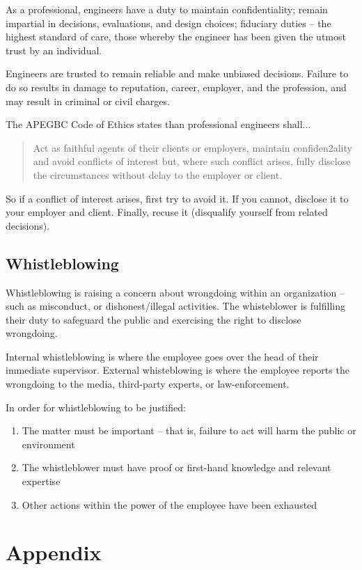 \documentclass{article}
\renewcommand\appendix{\par
  \setcounter{section}{0}
  \setcounter{subsection}{0}
  \setcounter{figure}{0}
  \setcounter{table}{0}
  \renewcommand\thesection{Appendix \Alph{section}}
  \renewcommand\thefigure{\Alph{section}\arabic{figure}}
  \renewcommand\thetable{\Alph{section}\arabic{table}}
}
\begin{document}
As a professional, engineers have a duty to maintain confidentiality; remain impartial in decisions, evaluations, and design choices; fiduciary duties -- the highest standard of care, those whereby the engineer has been given the utmost trust by an individual.

Engineers are trusted to remain reliable and make unbiased decisions. Failure to do so results in damage to reputation, career, employer, and the profession, and may result in criminal or civil charges.

The APEGBC Code of Ethics states than professional engineers shall... \begin{quote}
Act	 as	 faithful	 agents	 of	 their	 clients	 or	 employers,	
maintain	confiden2ality	and	avoid	conflicts	of	interest	but,	
where	such	conflict	arises,	fully	disclose	the	circumstances	
without	delay	to	the	employer	or	client.
\end{quote}

So if a conflict of interest arises, first try to avoid it. If you cannot, disclose it to your employer and client. Finally, recuse it (disqualify yourself from related decisions).

\subsection{Whistleblowing}

Whistleblowing is raising a concern about wrongdoing within an organization -- such as misconduct, or dishonest/illegal activities. The whisteblower is fulfilling their duty to safeguard the public and exercising the right to disclose wrongdoing.

Internal whistleblowing is where the employee goes over the head of their immediate supervisor. External whisteblowing is where the employee reports the wrongdoing to the media, third-party experts, or law-enforcement.

In order for whistleblowing to be justified: \begin{enumerate}
\item The matter must be important -- that is, failure to act will harm the public or environment
\item The whistleblower must have proof or first-hand knowledge and relevant expertise
\item Other actions within the power of the employee have been exhausted
\end{enumerate}

\newpage









\newpage

 
\pagebreak


\appendix
\onehalfspacing
\section*{Appendix}
\renewcommand{\thesubsection}{\Alph{subsection}}
\end{document}
